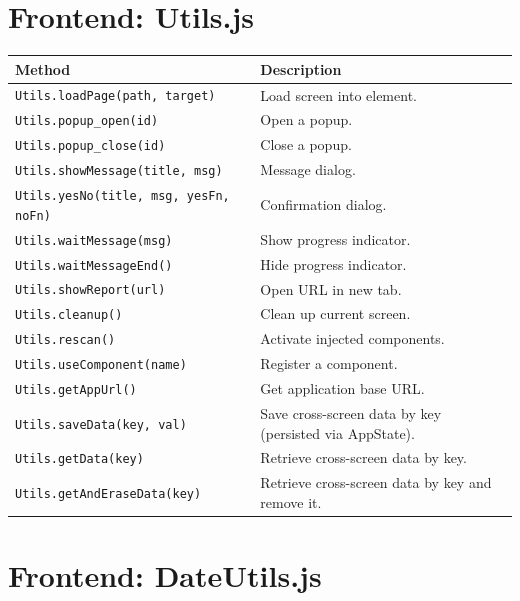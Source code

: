 \section{Frontend: Utils.js}
\label{sec:api-utilsjs}

\begin{longtable}{P{4.8cm}P{5.7cm}}
\toprule
\textbf{Method} & \textbf{Description} \\
\midrule
\endhead
\texttt{Utils.loadPage(path, target)} & Load screen into element. \\
\texttt{Utils.popup\_open(id)} & Open a popup. \\
\texttt{Utils.popup\_close(id)} & Close a popup. \\
\texttt{Utils.showMessage(title, msg)} & Message dialog. \\
\texttt{Utils.yesNo(title, msg, yesFn, noFn)} & Confirmation dialog. \\
\texttt{Utils.waitMessage(msg)} & Show progress indicator. \\
\texttt{Utils.waitMessageEnd()} & Hide progress indicator. \\
\texttt{Utils.showReport(url)} & Open URL in new tab. \\
\texttt{Utils.cleanup()} & Clean up current screen. \\
\texttt{Utils.rescan()} & Activate injected components. \\
\texttt{Utils.\allowbreak useComponent(\allowbreak name)} & Register a component. \\
\texttt{Utils.getAppUrl()} & Get application base URL. \\
\texttt{Utils.saveData(key, val)} & Save cross-screen data by key (persisted via AppState). \\
\texttt{Utils.getData(key)} & Retrieve cross-screen data by key. \\
\texttt{Utils.\allowbreak getAndEraseData(\allowbreak key)} & Retrieve cross-screen data by key and remove it. \\
\bottomrule
\end{longtable}

\section{Frontend: DateUtils.js}
\label{sec:api-dateutils-fe}

